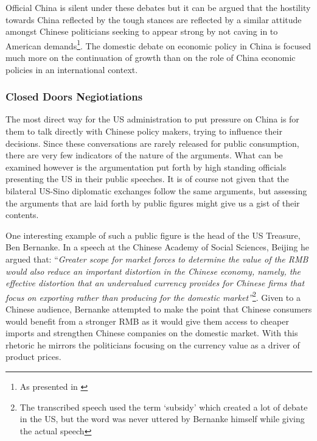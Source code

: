 Official China is silent under these debates but it can be argued that 
the hostility towards China reflected by the tough stances are reflected 
by a similar attitude amongst Chinese politicians seeking to appear 
strong by not caving in to American demands\footnote{As presented in 
\cite{Levy11}}. The domestic debate on economic policy in China is 
focused much more on the continuation of growth than on the role of 
China economic policies in an international context. 

\subsubsection{Closed Doors Negiotiations}


The most direct way for the US administration to put pressure on China 
is for them to talk directly with Chinese policy makers, trying to 
influence their decisions. Since these conversations are rarely released 
for public consumption, there are very few indicators of the nature of 
the arguments. What can be examined however is the argumentation put 
forth by high standing officials presenting the US in their public 
speeches. It is of course not given that the bilateral US-Sino 
diplomatic exchanges follow the same arguments, but assessing the 
arguments that are laid forth by public figures might give us a gist of 
their contents.

One interesting example of such a public figure is the head of the US 
Treasure, Ben Bernanke. In a speech at the Chinese Academy of Social 
Sciences, Beijing he argued that: ``\textit{Greater scope for market 
	forces to determine the value of the RMB would also reduce an 
	important distortion in the Chinese economy, namely, the effective 
	distortion that an undervalued currency provides for Chinese firms 
	that focus on exporting rather than producing for the domestic 
market''}\footnote{The transcribed speech \cite{Bernanke06} used the 
term `subsidy' which created a lot of debate in the US, but the word was 
never uttered by Bernanke himself while giving the actual 
speech\cite{reuters06}}. Given to a Chinese audience, Bernanke attempted 
to make the point that Chinese consumers would benefit from a stronger 
RMB as it would give them access to cheaper imports and strengthen 
Chinese companies on the domestic market. With this rhetoric he mirrors 
the politicians focusing on the currency value as a driver of product 
prices.

